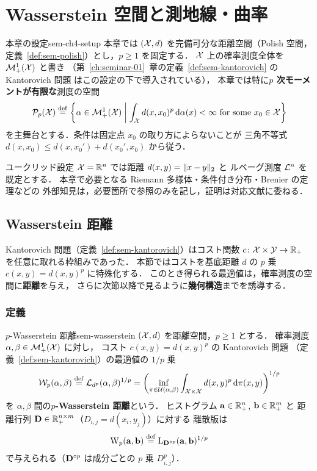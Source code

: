 \chapter{Wasserstein 空間と測地線・曲率}
\label{ch:seminar-03}

\begin{remark}{本章の設定}{sem-ch4-setup}
  本章では $(\mathcal{X}, d)$ を完備可分な距離空間（Polish 空間，
  定義~\ref{def:sem-polish}）とし，$p \geq 1$ を固定する．
  $\mathcal{X}$ 上の確率測度全体を $\mathcal{M}_+^1(\mathcal{X})$ と書き
  （第~\ref{ch:seminar-01}~章の定義~\ref{def:sem-kantorovich} の Kantorovich 問題
  はこの設定の下で導入されている），
  本章では特に\textbf{$p$ 次モーメントが有限な}測度の空間
  \[
    \mathcal{P}_p(\mathcal{X}) \overset{\mathrm{def}}{=}
    \left\{ \alpha \in \mathcal{M}_+^1(\mathcal{X}) \;\middle|\;
    \int_{\mathcal{X}} d(x, x_0)^p \, \mathrm{d}\alpha(x) < \infty
    \text{ for some } x_0 \in \mathcal{X} \right\}
  \]
  を主舞台とする．条件は固定点 $x_0$ の取り方によらないことが
  三角不等式 $d(x, x_0) \leq d(x, x_0') + d(x_0', x_0)$ から従う．

  ユークリッド設定 $\mathcal{X} = \mathbb{R}^n$ では距離 $d(x, y) = \lVert x - y \rVert_2$ と
  ルベーグ測度 $\mathcal{L}^n$ を既定とする．
  本章で必要となる Riemann 多様体・条件付き分布・Brenier の定理などの
  外部知見は，必要箇所で参照のみを記し，証明は対応文献に委ねる．
\end{remark}

\section{Wasserstein 距離}
\label{sec:sem-wasserstein}

Kantorovich 問題（定義~\ref{def:sem-kantorovich}）はコスト関数
$c \colon \mathcal{X} \times \mathcal{Y} \to \mathbb{R}_+$ を任意に取れる枠組みであった．
本節ではコストを基底距離 $d$ の $p$ 乗 $c(x, y) = d(x, y)^p$ に特殊化する．
このとき得られる最適値は，確率測度の空間に\textbf{距離}を与え，
さらに次節以降で見るように\textbf{幾何構造}までを誘導する．

\subsection{定義}

\begin{definition}{$p$-Wasserstein 距離}{sem-wasserstein}
  $(\mathcal{X}, d)$ を距離空間，$p \geq 1$ とする．
  確率測度 $\alpha, \beta \in \mathcal{M}_+^1(\mathcal{X})$ に対し，
  コスト $c(x, y) = d(x, y)^p$ の Kantorovich 問題
  （定義~\ref{def:sem-kantorovich}）の最適値の $1/p$ 乗
  \[
    \mathcal{W}_p(\alpha, \beta) \overset{\mathrm{def}}{=}
    \mathcal{L}_{d^p}(\alpha, \beta)^{1/p}
    = \left( \inf_{\pi \in \mathcal{U}(\alpha, \beta)}
      \int_{\mathcal{X} \times \mathcal{X}} d(x, y)^p \, \mathrm{d}\pi(x, y) \right)^{1/p}
  \]
  を $\alpha, \beta$ 間の\textbf{$p$-Wasserstein 距離}という．
  ヒストグラム $\mathbf{a} \in \mathbb{R}_+^n$, $\mathbf{b} \in \mathbb{R}_+^m$ と
  距離行列 $\mathbf{D} \in \mathbb{R}_+^{n \times m}$（$D_{i,j} = d(x_i, y_j)$）に対する
  離散版は
  \[
    \mathrm{W}_p(\mathbf{a}, \mathbf{b})
    \overset{\mathrm{def}}{=} \mathrm{L}_{\mathbf{D}^{\circ p}}(\mathbf{a}, \mathbf{b})^{1/p}
  \]
  で与えられる（$\mathbf{D}^{\circ p}$ は成分ごとの $p$ 乗 $D_{i,j}^p$）．
\end{definition}

